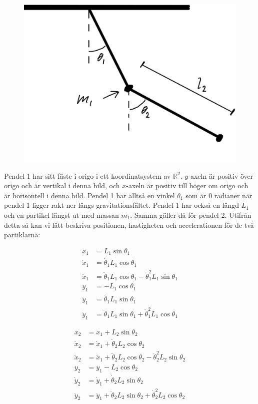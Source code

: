 \documentclass[10pt, a4paper]{amsart}
\begin{document}
\begin{figure}[H]
    \includegraphics[width=50ex]{photos/chapter5/1.jpg}
\end{figure} \bigskip 

Pendel 1 har sitt fäste i origo i ett koordinatsystem av $ \mathbb{R}^2 $. 
$ y $-axeln är positiv över origo och är vertikal i denna bild, 
och $ x $-axeln är positiv till höger om origo och är horisontell i denna bild. 
Pendel 1 har alltså en vinkel $ \theta_1 $ som är $ 0 $ radianer när pendel 1 ligger rakt ner längs gravitationsfältet. 
Pendel 1 har också en längd $ L_1 $ och en partikel längst ut med massan $ m_1 $. Samma gäller då för pendel 2. 
Utifrån detta så kan vi lätt beskriva positionen, hastigheten och accelerationen för de två partiklarna: \bigskip 

\begin{align}
    x_1 &= L_1\sin\theta_1 \\
    \dot x_1 &= \dot \theta_1L_1\cos \theta_1 \\
    \ddot x_1 &= \ddot \theta_1L_1\cos \theta_1 - \dot \theta_1^2L_1\sin \theta_1 \\
    y_1 &= -L_1\cos\theta_1 \\
    \dot y_1 &= \dot \theta_1L_1\sin \theta_1 \\
    \ddot y_1 &= \ddot \theta_1L_1\sin \theta_1 + \dot \theta_1^2L_1\cos \theta_1
\end{align}

\begin{align}
    x_2 &= x_1 + L_2\sin\theta_2 \\
    \dot x_2 &= \dot x_1 + \dot \theta_2L_2\cos \theta_2 \\
    \ddot x_2 &= \ddot x_1 + \ddot \theta_2L_2\cos \theta_2 - \dot \theta_2^2L_2\sin \theta_2 \\
    y_2 &= y_1 -L_2\cos\theta_2 \\
    \dot y_2 &= \dot y_1 + \dot \theta_2L_2\sin \theta_2 \\
    \ddot y_2 &= \ddot y_1 + \ddot \theta_2L_2\sin \theta_2 + \dot \theta_2^2L_2\cos \theta_2
\end{align} \bigskip 
\end{document}
